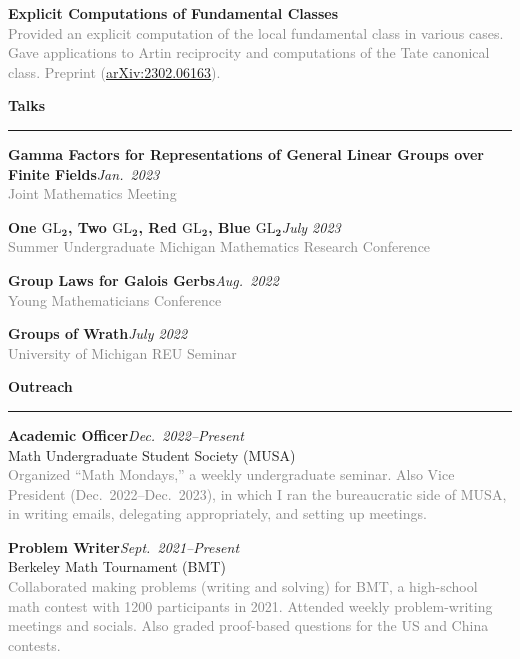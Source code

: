 \documentclass{article}
\renewcommand{\section}[1]{{\color{headercolor}\LARGE
    \textbf{#1\phantom{p}}\hrule}}
\newcommand{\entry}[5]{{\large\textbf{#1}}\hfill\textit{#3}\\
    #2\hfill\\
    \textcolor{gray}{#5}}
\newcommand{\award}[3]{{\large\textbf{#1}}\hfill\textit{#2}\\
    \textcolor{gray}{#3}}
\begin{document}
\award{Explicit Computations of Fundamental Classes}{}
{Provided an explicit computation of the local fundamental class in various cases. Gave applications to Artin reciprocity and computations of the Tate canonical class. Preprint (\underline{\href{https://arxiv.org/abs/2302.06163}{arXiv:2302.06163}}).}


\section{Talks}

\award{Gamma Factors for Representations of General Linear Groups over Finite Fields}{Jan.~2023}{Joint Mathematics Meeting}

\award{One $\mathbf{\mathrm{GL}_2}$, Two $\mathbf{\mathrm{GL}_2}$, Red $\mathbf{\mathrm{GL}_2}$, Blue $\mathbf{\mathrm{GL}_2}$}{July 2023}{Summer Undergraduate Michigan Mathematics Research Conference}

\award{Group Laws for Galois Gerbs}{Aug.~2022}{Young Mathematicians Conference}

\award{Groups of Wrath}{July 2022}{University of Michigan REU Seminar}

\section{Outreach}

\iffalse
    \entry{Technical Director}{Hyde Park Baptist Church Media Ministry}{Summer 2017--Present}{3 hours/week}
    {Operated the video switcher as final check before broadcast. Also occasional cameraperson. Served for weekly broadcasts, weddings, and funerals.}
\fi

\entry{Academic Officer}{Math Undergraduate Student Society (MUSA)}{Dec.~2022--Present}{}
{Organized ``Math Mondays,'' a weekly undergraduate seminar. Also Vice President (Dec.~2022--Dec.~2023), in which I ran the bureaucratic side of MUSA, in writing emails, delegating appropriately, and setting up meetings.}

\entry{Problem Writer}{Berkeley Math Tournament (BMT)}{Sept.~2021--Present}{}
{Collaborated making problems (writing and solving) for BMT, a high-school math contest with \raisebox{0.5ex}{\texttildelow}1200 participants in 2021. Attended weekly problem-writing meetings and socials. Also graded proof-based questions for the US and China contests.}
\end{document}
